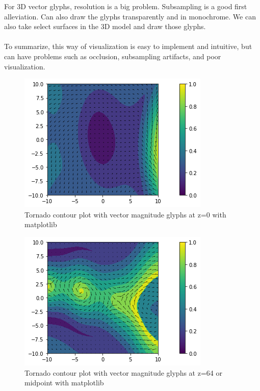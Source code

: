 \documentclass{article}
\begin{document}
For 3D vector glyphs, resolution is a big problem. Subsampling is a good first alleviation. Can also draw the glyphs transparently and in monochrome. We can also take select surfaces in the 3D model and draw those glyphs. 
\\\\
To summarize, this way of visualization is easy to implement and intuitive, but can have problems such as occlusion, subsampling artifacts, and poor visualization.

\begin{figure}[H]
\caption{Tornado contour plot with vector magnitude glyphs at z=0 with matplotlib}
\centering
\includegraphics[scale=0.55]{tornado_2d_contour_glyphs.png}
\end{figure}

\begin{figure}[H]
\caption{Tornado contour plot with vector magnitude glyphs at z=64 or midpoint with matplotlib}
\centering
\includegraphics[scale=0.55]{tornado_2d_contour_mid.png}
\end{figure}
\end{document}

